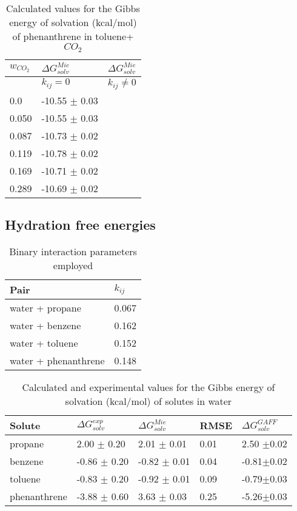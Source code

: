 \begin{table}[h]
\center
  \caption{Calculated values for the Gibbs energy of solvation (kcal/mol) of phenanthrene in toluene+$CO_{2}$}
  \label{tbl:solv3}
  \begin{tabular}{lll}
    \hline
      $w_{CO_{2}}$ & $\Delta G_{solv}^{Mie}$ & $\Delta G_{solv}^{Mie}$\\
    \hline
     & $k_{ij}=0$& $k_{ij} \neq 0$\\
    \hline
    0.0    & -10.55 $\pm$ 0.03  & \\
    0.050  & -10.55 $\pm$ 0.03  & \\
    0.087  & -10.73 $\pm$ 0.02  & \\
    0.119  & -10.78 $\pm$ 0.02  & \\
    0.169  & -10.71 $\pm$ 0.02  & \\
    0.289  & -10.69 $\pm$ 0.02  & \\
    \hline
  \end{tabular}

\end{table}

\subsection{Hydration free energies}


\begin{table}[h]
\center
  \caption{Binary interaction parameters employed}
  \label{tbl:kij}
  \begin{tabular}{ll}
    \hline
      Pair & $k_{ij}$ \\
    \hline
    water  + propane      & 0.067  \\
    water  + benzene      & 0.162 \\  
    water  + toluene      & 0.152 \\
    water  + phenanthrene & 0.148  \\
    \hline
  \end{tabular}

\end{table}

\begin{table*}[h]
\center
  \caption{Calculated and experimental values for the Gibbs energy of solvation (kcal/mol) of solutes in water}
  \label{tbl:solv2}
  \begin{tabular}{lllll}
    \hline
     Solute      & $\Delta G_{solv}^{exp}$ & $\Delta G_{solv}^{Mie}$ & RMSE &$\Delta G_{solv}^{GAFF}$ \\
    \hline
    propane      &  2.00 $\pm$ 0.20 & 2.01 $\pm$ 0.01& 0.01 &2.50 $\pm$0.02 \\
    benzene      & -0.86 $\pm$ 0.20 & -0.82 $\pm$ 0.01    &  0.04    &-0.81$\pm$0.02 \\  
    toluene      & -0.83 $\pm$ 0.20 & -0.92 $\pm$ 0.01   &  0.09    &-0.79$\pm$0.03\\
    phenanthrene & -3.88 $\pm$ 0.60 & 3.63 $\pm$ 0.03& 0.25 &-5.26$\pm$0.03 \\
    \hline
  \end{tabular}

\end{table*}
